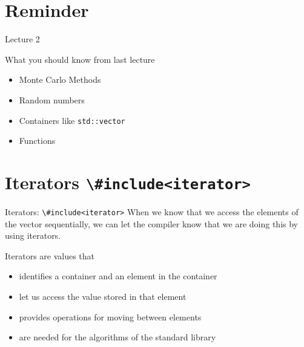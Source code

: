 \documentclass[12pt,t]{beamer}
\title{\coursename}
\subtitle{Lecture 3: Iterators, Lists, and using library algorithms}
\date {
 \tiny \url{\courseurl}
\vspace{2cm}
\doclicenseThis  
  
}
\begin{document}
 {
    \frame {
        \titlepage
    }
}

\frame{

\tableofcontents

}


\section{Reminder}

\begin{frame}{Lecture 2}
\begin{block}{What you should know from last lecture}
\begin{itemize}
\item Monte Carlo Methods
\item Random numbers
\item Containers like \lstinline|std::vector|
\item Functions
\end{itemize}
\end{block}
\end{frame}

\section{Iterators \lstinline|\#include<iterator>|}

\begin{frame}{Iterators: \lstinline|\#include<iterator>|}
When we know that we access the elements of the vector sequentially, we can let the compiler know that we are doing this by using iterators.
\vspace{1cm}
\begin{block}{Iterators are values that}
\begin{itemize}
\item identifies a container and an element in the container
\item let us access the value stored in that element
\item provides operations for moving between elements
\item are needed for the algorithms of the standard library
\end{itemize}
\end{block}


\end{frame}
\end{document}
